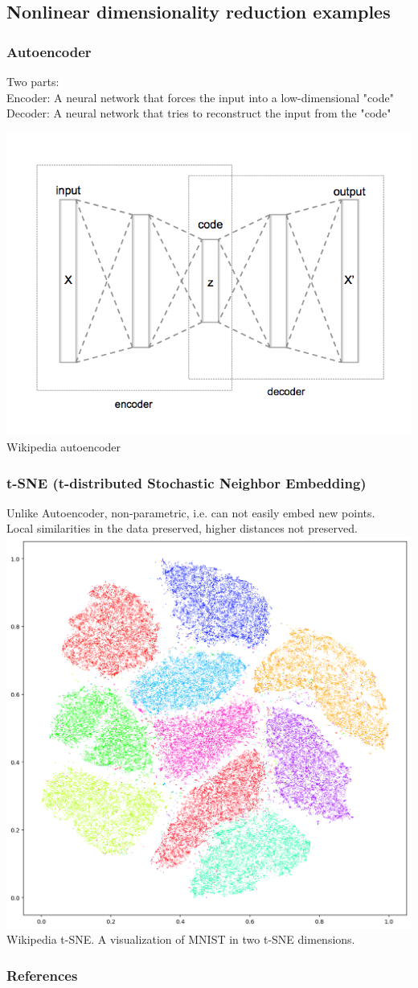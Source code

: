 \documentclass[Nike]{tuberlinbeamer}
\begin{document}
\subsection{Nonlinear dimensionality reduction examples}
\begin{frame}\frametitle{Autoencoder}
  Two parts: \\
  Encoder: A neural network that forces the input into a low-dimensional "code"\\
  Decoder: A neural network that tries to reconstruct the input from the "code"

  \centering
  \includegraphics[width=.5\textwidth]{autoencoder}\\
  \tiny Wikipedia autoencoder
\end{frame}

\begin{frame}\frametitle{t-SNE (t-distributed Stochastic Neighbor Embedding)}
  Unlike Autoencoder, non-parametric, i.e. can not easily embed new points.\\
  Local similarities in the data preserved, higher distances not preserved.\\

  \centering
  \includegraphics[width=.3\textwidth]{T-SNE_Embedding_of_MNIST.png}\\
  \tiny Wikipedia t-SNE. A visualization of MNIST in two t-SNE dimensions.
\end{frame}

\begin{frame}%
  \frametitle{References}
  \printbibliography
\end{frame}
\end{document}
